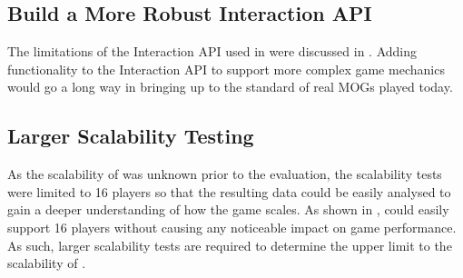 \subsection{Build a More Robust Interaction API}
The limitations of the Interaction API used in \game{} were discussed in . Adding functionality to the Interaction API to support more complex game mechanics would go a long way in bringing \game{} up to the standard of real MOGs played today.

\subsection{Larger Scalability Testing}
As the scalability of \game{} was unknown prior to the evaluation, the scalability tests were limited to 16 players so that the resulting data could be easily analysed to gain a deeper understanding of how the game scales. As shown in , \game{} could easily support 16 players without causing any noticeable impact on game performance. As such, larger scalability tests are required to determine the upper limit to the scalability of \game{}. 
